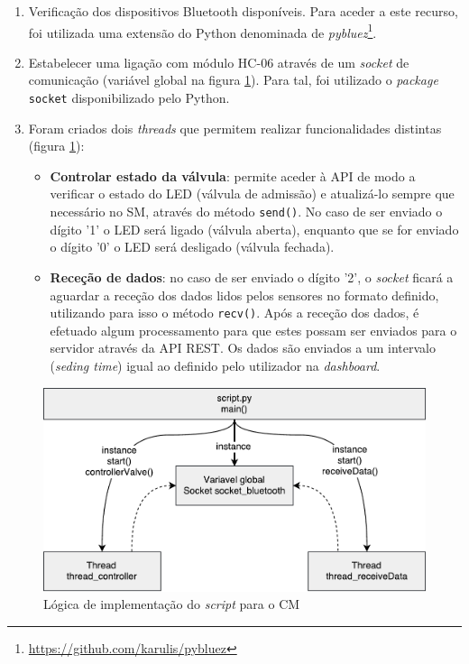 \begin{enumerate}
	\item Verificação dos dispositivos Bluetooth disponíveis. Para aceder a este recurso, foi utilizada uma extensão do Python denominada de \textit{pybluez}\footnote{\url{https://github.com/karulis/pybluez}}. 
	
	
	\item Estabelecer uma ligação com módulo HC-06 através de um \textit{socket} de comunicação (variável global na figura \ref{threadscript}). Para tal, foi utilizado o \textit{package} \texttt{socket} disponibilizado pelo Python.
	
	\item Foram criados dois \textit{threads} que permitem realizar funcionalidades distintas (figura \ref{threadscript}): 
	
	\begin{itemize}
		\item \textbf{Controlar estado da válvula}: permite aceder à \ac{API} de modo a verificar o estado do \ac{LED}  (válvula de admissão) e atualizá-lo sempre que necessário no \acl{SM}, através do método \texttt{send()}. No caso de ser enviado o dígito '1' o \ac{LED} será ligado (válvula aberta), enquanto que se for enviado o dígito '0' o  \ac{LED} será desligado (válvula fechada). 
		
		\item \textbf{Receção de dados}: no caso de ser enviado o  dígito '2', o \textit{socket} ficará a aguardar a receção dos dados lidos pelos sensores no formato definido, utilizando para isso o método \texttt{recv()}. Após a receção dos dados, é efetuado algum processamento para que estes possam ser enviados para o servidor através da \ac{API} REST. Os dados são enviados a um intervalo (\textit{seding time}) igual  ao definido pelo utilizador na \textit{dashboard}.
		
		
	\end{itemize}
	
	

\end{enumerate}





\begin{figure}[h]
	\centering
	\includegraphics[width=0.67\linewidth]{esquemas/threads-python-script.pdf}
	\caption{Lógica de implementação do \textit{script} para o \acl{CM} }
	\label{threadscript}
\end{figure}










